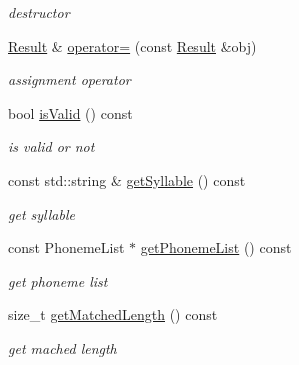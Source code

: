 \begin{DoxyCompactItemize}
\begin{DoxyCompactList}\small\item\em destructor \end{DoxyCompactList}\item 
\hypertarget{classsinsy_1_1PhonemeTable_1_1Result_a179973ec98736168b5de9987ef831786}{\hyperlink{classsinsy_1_1PhonemeTable_1_1Result}{\-Result} \& \hyperlink{classsinsy_1_1PhonemeTable_1_1Result_a179973ec98736168b5de9987ef831786}{operator=} (const \hyperlink{classsinsy_1_1PhonemeTable_1_1Result}{\-Result} \&obj)}\label{classsinsy_1_1PhonemeTable_1_1Result_a179973ec98736168b5de9987ef831786}

\begin{DoxyCompactList}\small\item\em assignment operator \end{DoxyCompactList}\item 
bool \hyperlink{classsinsy_1_1PhonemeTable_1_1Result_a0f2bc3453a06deded3379517fd6889a4}{is\-Valid} () const 
\begin{DoxyCompactList}\small\item\em is valid or not \end{DoxyCompactList}\item 
\hypertarget{classsinsy_1_1PhonemeTable_1_1Result_ac61923a8fe4f442b07d8c233240517c6}{const std\-::string \& \hyperlink{classsinsy_1_1PhonemeTable_1_1Result_ac61923a8fe4f442b07d8c233240517c6}{get\-Syllable} () const }\label{classsinsy_1_1PhonemeTable_1_1Result_ac61923a8fe4f442b07d8c233240517c6}

\begin{DoxyCompactList}\small\item\em get syllable \end{DoxyCompactList}\item 
\hypertarget{classsinsy_1_1PhonemeTable_1_1Result_ae5d3be37d5ef72faf933901b44d1e84c}{const \-Phoneme\-List $\ast$ \hyperlink{classsinsy_1_1PhonemeTable_1_1Result_ae5d3be37d5ef72faf933901b44d1e84c}{get\-Phoneme\-List} () const }\label{classsinsy_1_1PhonemeTable_1_1Result_ae5d3be37d5ef72faf933901b44d1e84c}

\begin{DoxyCompactList}\small\item\em get phoneme list \end{DoxyCompactList}\item 
size\-\_\-t \hyperlink{classsinsy_1_1PhonemeTable_1_1Result_a74d2aac338ae62f51734a4410878a020}{get\-Matched\-Length} () const 
\begin{DoxyCompactList}\small\item\em get mached length \end{DoxyCompactList}\end{DoxyCompactItemize}


